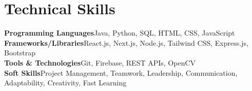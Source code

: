 \documentclass[letterpaper,11pt]{article}
\begin{document}
\section{Technical Skills}
 \begin{itemize}[leftmargin=0.15in, label={}]
    \small{\item{
     \textbf{Programming Languages}{Java, Python, SQL, HTML, CSS, JavaScript} \\
     \textbf{Frameworks/Libraries}{React.js, Next.js, Node.js, Tailwind CSS, Express.js, Bootstrap} \\
     \textbf{Tools & Technologies}{Git, Firebase, REST APIs, OpenCV} \\
     \textbf{Soft Skills}{Project Management, Teamwork, Leadership, Communication, Adaptability, Creativity, Fast Learning} \\
    }}
 \end{itemize}
 \vspace{-16pt}
\end{document}
